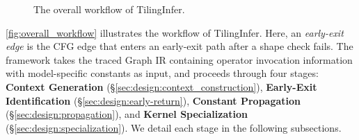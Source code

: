 \documentclass[manuscript,screen,review]{acmart}
\theoremstyle{indenteditalic}
\providecommand{\DIFaddtex}[1]{{\protect\color{blue}#1}} %
\providecommand{\DIFaddbegin}{} %
\providecommand{\DIFaddend}{} %
\providecommand{\DIFadd}[1]{\texorpdfstring{\DIFaddtex{#1}}{#1}} %
\begin{document}
\begin{figure}[htbp]
{
    }
    \caption{The overall workflow of TilingInfer.}
    \label{fig:overall_workflow}
\end{figure}
\DIFaddend 


\autoref{fig:overall_workflow} illustrates the workflow of TilingInfer.
\DIFaddbegin \DIFadd{Here, an }\emph{\DIFadd{early-exit edge}} \DIFadd{is the CFG edge that enters an early-exit path after a shape check fails.
}\DIFaddend The framework takes the traced Graph IR containing operator invocation information with model-specific constants as input, and proceeds through four stages: \textbf{Context Generation} (\S\ref{sec:design:context_construction}), \textbf{Early-Exit Identification} (\S\ref{sec:design:early-return}), \textbf{Constant Propagation} (\S\ref{sec:design:propagation}), and \textbf{Kernel Specialization} (\S\ref{sec:design:specialization}).
We detail each stage in the following subsections.
\end{document}
